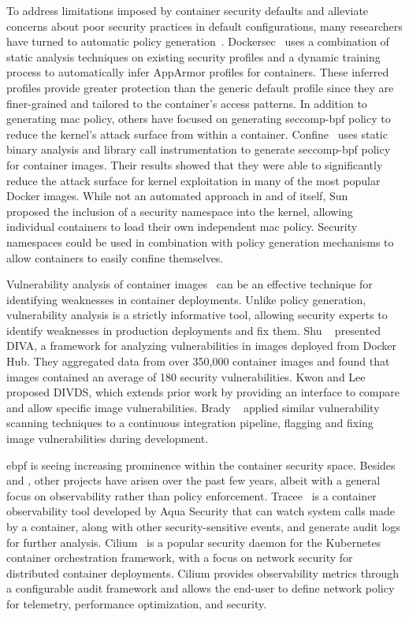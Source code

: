 To address limitations imposed by container security defaults and alleviate concerns about
poor security practices in default configurations, many researchers have turned to
automatic policy generation~\cite{loukidis2018_dockersec, ghavamania2020_confine}.
Dockersec~\cite{loukidis2018_dockersec} uses a combination of static analysis techniques
on existing security profiles and a dynamic training process to automatically infer
AppArmor profiles for containers.  These inferred profiles provide greater protection than
the generic default profile since they are finer-grained and tailored to the container's
access patterns. In addition to generating \gls{mac} policy, others have focused on
generating seccomp-bpf policy to reduce the kernel's attack surface from within
a container. Confine~\cite{ghavamania2020_confine} uses static binary analysis and library
call instrumentation to generate seccomp-bpf policy for container images.  Their results
showed that they were able to significantly reduce the attack surface for kernel
exploitation in many of the most popular Docker images. While not an automated approach in
and of itself, Sun \etal~\cite{sun2018_security_namespace} proposed the inclusion of
a security namespace into the kernel, allowing individual containers to load their own
independent \gls{mac} policy. Security namespaces could be used in combination with policy
generation mechanisms to allow containers to easily confine themselves.

Vulnerability analysis of container images~\cite{shu2017_image_vuln, kwon2020_divds,
brady2020_docker_cloud} can be an effective technique for identifying weaknesses in
container deployments. Unlike policy generation, vulnerability analysis is a strictly
informative tool, allowing security experts to identify weaknesses in production
deployments and fix them. Shu \etal~\cite{shu2017_image_vuln} presented DIVA, a framework
for analyzing vulnerabilities in images deployed from Docker Hub. They aggregated data
from over 350,000 container images and found that images contained an average of 180
security vulnerabilities. Kwon and Lee~\cite{kwon2020_divds} proposed DIVDS, which
extends prior work by providing an interface to compare and allow specific image
vulnerabilities.  Brady \etal~\cite{brady2020_docker_cloud} applied similar vulnerability
scanning techniques to a continuous integration pipeline, flagging and fixing image
vulnerabilities during development.

\gls{ebpf} is seeing increasing prominence within the container security space. Besides
\bpfbox{} and \bpfcontain{}, other projects have arisen over the past few years, albeit
with a general focus on observability rather than policy enforcement. Tracee~
is a container observability tool developed by Aqua Security that can watch system calls
made by a container, along with other security-sensitive events, and generate audit logs
for further analysis. Cilium~ is a popular security daemon for the Kubernetes
container orchestration framework, with a focus on network security for distributed
container deployments. Cilium provides observability metrics through a configurable audit
framework and allows the end-user to define network policy for telemetry, performance
optimization, and security.

